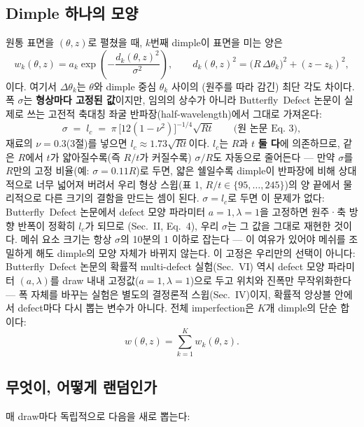\documentclass[11pt]{article}
\begin{document}
\subsection{Dimple 하나의 모양}

원통 표면을 $(\theta, z)$로 펼쳤을 때, $k$번째 dimple이 표면을 미는 양은
\[
  w_k(\theta, z) = a_k \exp\!\left(-\frac{d_k(\theta,z)^2}{\sigma^2}\right),
  \qquad
  d_k(\theta,z)^2 = \big(R\,\Delta\theta_k\big)^2 + (z - z_k)^2,
\]
이다. 여기서 $\Delta\theta_k$는 $\theta$와 dimple 중심 $\theta_k$ 사이의
(원주를 따라 감긴) 최단 각도 차이다. 폭 $\sigma$는 \textbf{형상마다 고정된
값}이지만, 임의의 상수가 아니라 Butterfly~Defect 논문이 실제로 쓰는 고전적
축대칭 좌굴 반파장(half-wavelength)에서 그대로 가져온다:
\[
  \sigma \;=\; l_c \;=\; \pi\,\big[12(1-\nu^2)\big]^{-1/4}\sqrt{Rt}
  \qquad \text{(원 논문 Eq.~3)},
\]
재료의 $\nu = 0.3$(3절)를 넣으면 $l_c \approx 1.73\sqrt{Rt}$이다. $l_c$는
$R$과 $t$ \textbf{둘 다}에 의존하므로, 같은 $R$에서 $t$가 얇아질수록(즉 $R/t$가
커질수록) $\sigma/R$도 자동으로 줄어든다 --- 만약 $\sigma$를 $R$만의 고정
비율(예: $\sigma = 0.11R$)로 두면, 얇은 쉘일수록 dimple이 반파장에 비해
상대적으로 너무 넓어져 버려서 우리 형상 스윕(표 1, $R/t\in\{95,\dots,245\}$)의
양 끝에서 물리적으로 다른 크기의 결함을 만드는 셈이 된다. $\sigma=l_c$로 두면
이 문제가 없다: Butterfly~Defect 논문에서 defect 모양 파라미터
$a{=}1,\lambda{=}1$을 고정하면 원주·축 방향 반폭이 정확히 $l_c$가 되므로
(Sec.~II, Eq.~4), 우리 $\sigma$는 그 값을 그대로 재현한 것이다. 메쉬 요소
크기는 항상 $\sigma$의 10분의 1 이하로 잡는다 --- 이 여유가 있어야 메쉬를
조밀하게 해도 dimple의 모양 자체가 바뀌지 않는다. 이 고정은 우리만의 선택이
아니다: Butterfly~Defect 논문의 확률적 multi-defect 실험(Sec.~VI) 역시 defect
모양 파라미터 $(a,\lambda)$를 draw 내내 고정값($a{=}1,\lambda{=}1$)으로 두고
위치와 진폭만 무작위화한다 --- 폭 자체를 바꾸는 실험은 별도의 결정론적
스윕(Sec.~IV)이지, 확률적 앙상블 안에서 defect마다 다시 뽑는 변수가 아니다.
전체 imperfection은 $K$개 dimple의 단순 합이다:
\[
  w(\theta, z) = \sum_{k=1}^{K} w_k(\theta, z).
\]

\subsection{무엇이, 어떻게 랜덤인가}

매 draw마다 독립적으로 다음을 새로 뽑는다:
\end{document}

